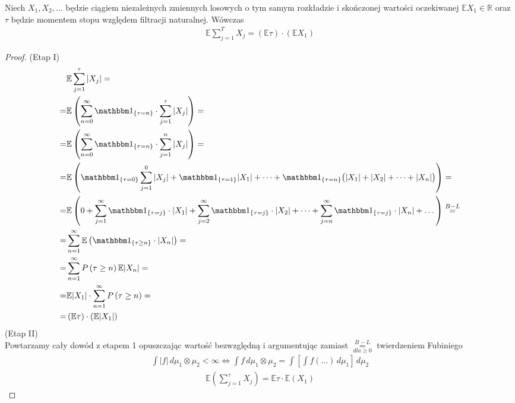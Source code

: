 \begin{twr}
Niech $ X_1,X_2,\dots $ będzie ciągiem niezależnych zmiennych losowych o tym samym rozkładzie i skończonej wartości oczekiwanej $ \mathbb E X_1\in \mathbb R  $ oraz $ \tau  $ będzie momentem stopu względem filtracji naturalnej. Wówczas
\begin{gather*}
\mathbb E \sum_{j=1}^{T}X_j=\left(\mathbb E \tau\right)\cdot \left(\mathbb E X_1\right)
\end{gather*}
\begin{proof}
(Etap I)
\begin{align*}
&\mathbb E \sum_{j=1}^{\tau}|X_j|
=\\=&
\mathbb E \left(\sum_{n=0}^{\infty }\mathbbm1_{\left\{\tau=n\right\}}\cdot\sum_{j=1}^{\tau}|X_j|\right)
=\\=&
\mathbb E \left(\sum_{n=0}^{\infty }\mathbbm1_{\left\{\tau=n\right\}}\cdot\sum_{j=1}^{n}|X_j|\right)
=\\=&
\mathbb E \left(\mathbbm1_{\left\{\tau=0\right\}}\sum_{j=1}^{0}|X_j|+\mathbbm1_{\left\{\tau=1\right\}}|X_1|+\dots +\mathbbm1_{\left\{\tau=n\right\}}\bigl(|X_1|+|X_2|+\dots +|X_n|\bigr)\right)
=\\=&
\mathbb E \left(0+\sum_{j=1}^{\infty }\mathbbm1_{\left\{\tau=j\right\}}\cdot|X_1|+\sum_{j=2}^{\infty }\mathbbm1_{\left\{\tau=j\right\}}\cdot|X_2|+\dots+\sum_{j=n}^{\infty }\mathbbm1_{\left\{\tau=j\right\}}\cdot|X_n|+\dots\right)
\stackrel{B-L}{=}\\=&
\sum_{n=1}^{\infty }\mathbb E \left(\mathbbm1_{\left\{\tau\ge n\right\}}\cdot|X_n|\right)
=\\=&
\sum_{n=1}^{\infty }P \left(\tau\ge n\right)\mathbb E |X_n|
=\\=&
\mathbb E |X_1|\cdot \sum_{n=1}^{\infty }P\left(\tau\ge n\right)
=\\=&
\left(\mathbb E \tau \right)\cdot \left(\mathbb E |X_1|\right)
\end{align*}
(Etap II)\\
Powtarzamy cały dowód z etapem 1 opuszczając wartość bezwzględną i argumentując zamiast $ \overset{B-L}{\underset{dla \ge 0}{=}} $ twierdzeniem Fubiniego
\begin{gather*}
\int |f|\,d\mu_1\otimes\mu_2<\infty \Leftrightarrow \int f\,d\mu_1\otimes\mu_2=\int \left[\int f(\dots)\,d\mu_1\right]\,d\mu_2
\end{gather*}
\begin{gather*}
\mathbb E \left(\sum_{j=1}^{\tau}X_j\right)=\mathbb E \tau \cdot \mathbb E (X_1)
\end{gather*}
\end{proof}
\end{twr}
